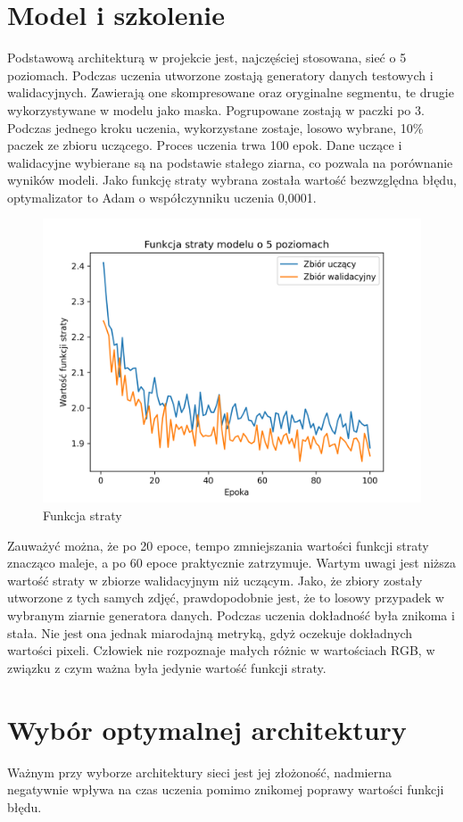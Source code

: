 \documentclass[a4paper, 12pt]{article}
\begin{document}
\section{Model i szkolenie}
Podstawową architekturą w projekcie jest, najczęściej stosowana, sieć o 5 poziomach.
Podczas uczenia utworzone zostają generatory danych testowych i walidacyjnych.
Zawierają one skompresowane oraz oryginalne segmentu, te drugie wykorzystywane w modelu jako maska.
Pogrupowane zostają w paczki po 3.
Podczas jednego kroku uczenia, wykorzystane zostaje, losowo wybrane, 10\% paczek ze zbioru uczącego.
Proces uczenia trwa 100 epok.
Dane uczące i walidacyjne wybierane są na podstawie stałego ziarna, co pozwala na porównanie wyników modeli.
Jako funkcję straty wybrana została wartość bezwzględna błędu, optymalizator to Adam o współczynniku uczenia 0,0001.

\begin{figure}[h!]
\begin{center}
	\includegraphics[width=0.7\columnwidth]{loss5.png}
	\caption{Funkcja straty}
\end{center}
\end{figure}

Zauważyć można, że po 20 epoce, tempo zmniejszania wartości funkcji straty znacząco maleje,
a po 60 epoce praktycznie zatrzymuje.
Wartym uwagi jest niższa wartość straty w zbiorze walidacyjnym niż uczącym. Jako, że zbiory zostały utworzone z tych samych zdjęć,
prawdopodobnie jest, że to losowy przypadek w wybranym ziarnie generatora danych.
Podczas uczenia dokładność była znikoma i stała. Nie jest ona jednak miarodajną metryką, gdyż oczekuje dokładnych wartości pixeli.
Człowiek nie rozpoznaje małych różnic w wartościach RGB, w związku z czym ważna była jedynie wartość funkcji straty.

\section{Wybór optymalnej architektury}
Ważnym przy wyborze architektury sieci jest jej złożoność, nadmierna negatywnie wpływa na czas uczenia pomimo znikomej poprawy wartości funkcji błędu.
\end{document}
